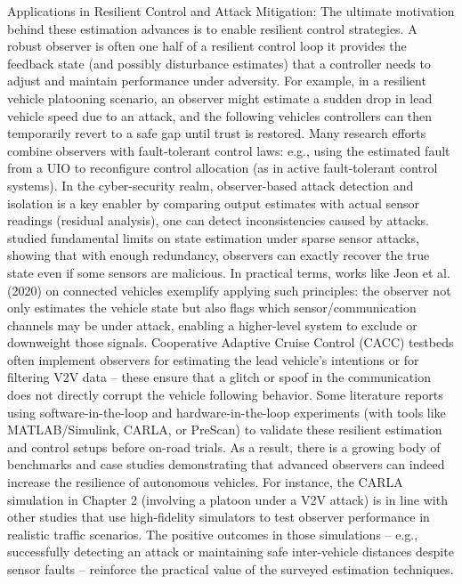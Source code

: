 Applications in Resilient Control and Attack Mitigation: 
The ultimate motivation behind these estimation advances is to enable resilient control strategies. 
A robust observer is often one half of a resilient control loop it provides the feedback state (and possibly disturbance estimates) that a controller needs to adjust and maintain performance under adversity. 
For example, in a resilient vehicle platooning scenario, an observer might estimate a sudden drop in lead vehicle speed due to an attack, and the following vehicles controllers can then temporarily revert to a safe gap until trust is restored. 
Many research efforts combine observers with fault-tolerant control laws: e.g., using the estimated fault from a UIO to reconfigure control allocation (as in active fault-tolerant control systems). 
In the cyber-security realm, observer-based attack detection and isolation is a key enabler by comparing output estimates with actual sensor readings (residual analysis), one can detect inconsistencies caused by attacks. 
\cite{Fawzi20141454} studied fundamental limits on state estimation under sparse sensor attacks, showing that with enough redundancy, observers can exactly recover the true state even if some sensors are malicious. In practical terms, works like Jeon et al. (2020) on connected vehicles exemplify applying such principles: the observer not only estimates the vehicle state but also flags which sensor/communication channels may be under attack, enabling a higher-level system to exclude or downweight those signals. Cooperative Adaptive Cruise Control (CACC) testbeds often implement observers for estimating the lead vehicle’s intentions or for filtering V2V data – these ensure that a glitch or spoof in the communication does not directly corrupt the vehicle following behavior. Some literature reports using software-in-the-loop and hardware-in-the-loop experiments (with tools like MATLAB/Simulink, CARLA, or PreScan) to validate these resilient estimation and control setups before on-road trials. As a result, there is a growing body of benchmarks and case studies demonstrating that advanced observers can indeed increase the resilience of autonomous vehicles. For instance, the CARLA simulation in Chapter 2 (involving a platoon under a V2V attack) is in line with other studies that use high-fidelity simulators to test observer performance in realistic traffic scenarios. The positive outcomes in those simulations – e.g., successfully detecting an attack or maintaining safe inter-vehicle distances despite sensor faults – reinforce the practical value of the surveyed estimation techniques.

